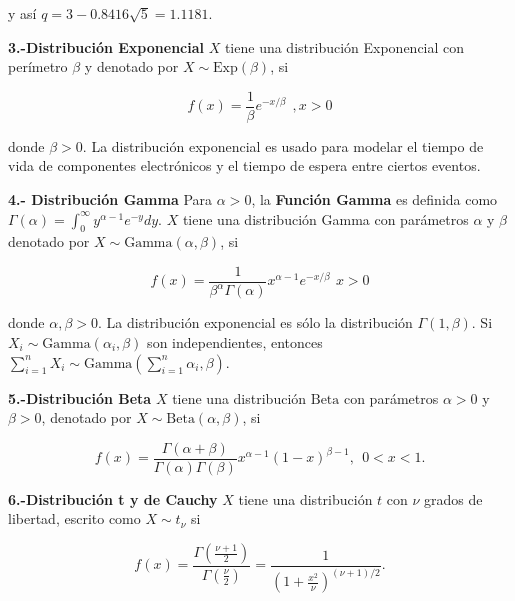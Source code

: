 \documentclass{article}\usepackage[]{graphicx}\usepackage[]{color}
\begin{document}
y as\'i $q = 3  -0.8416\sqrt{5} = 1.1181.$


\vspace{0.5cm}

\textbf{3.-Distribuci\'on Exponencial} $X$ tiene una distribuci\'on Exponencial con per\'imetro $\beta$ y denotado por $X \sim \mbox{Exp}(\beta)$, si

\[
f(x) = \frac{1}{\beta}e^{-x/\beta}\ \ , x > 0
\]

\vspace{0.2cm}

donde $\beta > 0$. La distribuci\'on exponencial es usado para modelar el tiempo de vida de componentes electr\'onicos y el tiempo de espera entre ciertos eventos.

\vspace{0.5cm}

\textbf{4.- Distribuci\'on Gamma} Para $\alpha > 0$, la \textbf{Funci\'on Gamma} es definida como $\Gamma(\alpha) = \int_{0}^{\infty}y^{\alpha -1}e^{-y}dy$. $X$ tiene una distribuci\'on Gamma con par\'ametros $\alpha$ y $\beta$ denotado por $X \sim \mbox{Gamma}(\alpha, \beta)$, si

\[
f(x) = \frac{1}{\beta^{\alpha}\Gamma(\alpha)}x^{\alpha -1}e^{-x/\beta}\ \, x >0
\]

donde $\alpha, \beta > 0$. La distribuci\'on exponencial es s\'olo la distribuci\'on $\Gamma(1, \beta)$. Si $X_i \sim \mbox{Gamma}(\alpha_i, \beta)$ son independientes, entonces $\sum_{i = 1}^{n} X_i \sim \mbox{Gamma}(\sum_{i = 1}^{n} \alpha_i, \beta)$. 

\vspace{0.5cm}

\textbf{5.-Distribuci\'on Beta} $X$ tiene una distribuci\'on $\mbox{Beta}$ con par\'ametros $\alpha > 0$  y $\beta > 0$, denotado por $X \sim \mbox{Beta}(\alpha, \beta)$, si

\[
f(x) = \frac{\Gamma(\alpha + \beta)}{\Gamma(\alpha)\Gamma(\beta)}x^{\alpha -1}(1 -x)^{\beta -1}, \ \ 0< x < 1.
\]

\vspace{0.5cm}

\textbf{6.-Distribuci\'on t y de Cauchy} $X$ tiene una distribuci\'on $t$ con $\nu$ grados de libertad, escrito como $X \sim t_{\nu}$ si 

\[
f(x) = \frac{\Gamma(\frac{\nu +1}{2})}{\Gamma(\frac{\nu}{2})} = \frac{1}{(1 + \frac{x^2}{\nu})^{(\nu + 1)/2}}.
\]

\vspace{0.3cm}
\end{document}
